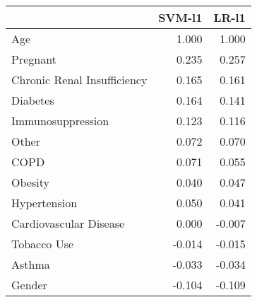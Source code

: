 \begin{tabular}{lrr}
\toprule
{} &  SVM-l1 &  LR-l1 \\
\midrule
Age                         &   1.000 &  1.000 \\
Pregnant                    &   0.235 &  0.257 \\
Chronic Renal Insufficiency &   0.165 &  0.161 \\
Diabetes                    &   0.164 &  0.141 \\
Immunosuppression           &   0.123 &  0.116 \\
Other                       &   0.072 &  0.070 \\
COPD                        &   0.071 &  0.055 \\
Obesity                     &   0.040 &  0.047 \\
Hypertension                &   0.050 &  0.041 \\
Cardiovascular Disease      &   0.000 & -0.007 \\
Tobacco Use                 &  -0.014 & -0.015 \\
Asthma                      &  -0.033 & -0.034 \\
Gender                      &  -0.104 & -0.109 \\
\bottomrule
\end{tabular}
